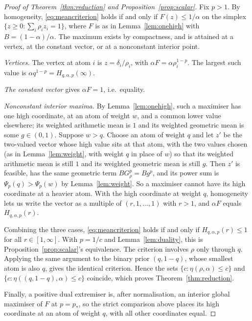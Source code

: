 \documentclass[11pt,a4paper]{article}
\numberwithin{equation}{section}
\theoremstyle{definition}
\theoremstyle{remark}
\begin{document}
\begin{proof}[Proof of Theorem~\ref{thm:reduction} and Proposition~\ref{prop:scalar}]
Fix \(p>1\). By homogeneity, \eqref{eq:meancriterion} holds if and only if
\(F(z)\le 1/\alpha\) on the simplex \(\{z\ge0:\sum_i\rho_iz_i=1\}\), where
\(F\) is as in Lemma~\ref{lem:onehigh} with \(B=(1-\alpha)/\alpha\). The
maximum exists by compactness, and is attained at a vertex, at the constant
vector, or at a nonconstant interior point.

\emph{Vertices.} The vertex at atom \(i\) is \(z=\delta_i/\rho_i\), with
\(\alpha F=\alpha\rho_i^{1-p}\). The largest such value is
\(\alpha q^{1-p}=H_{q,\alpha,p}(\infty)\).

\emph{The constant vector} gives \(\alpha F=1\), i.e.\ equality.

\emph{Nonconstant interior maxima.} By Lemma~\ref{lem:onehigh}, such a
maximiser has one high coordinate, at an atom of weight \(w\), and a common
lower value elsewhere; its weighted arithmetic mean is \(1\) and its
weighted geometric mean is some \(g\in(0,1)\). Suppose \(w>q\). Choose an
atom of weight \(q\) and let \(z'\) be the two-valued vector whose high
value sits at that atom, with the two values chosen (as in
Lemma~\ref{lem:weight}, with weight \(q\) in place of \(w\)) so that its
weighted arithmetic mean is still \(1\) and its weighted geometric mean is
still \(g\). Then \(z'\) is feasible, has the same geometric term
\(BG_\rho^p=Bg^p\), and its power sum is \(\Psi_p(q)>\Psi_p(w)\) by
Lemma~\ref{lem:weight}.
So a maximiser cannot have its high coordinate at a heavier atom. With the
high coordinate at weight \(q\), homogeneity lets us write the vector as a
multiple of \((r,1,\ldots,1)\) with \(r>1\), and \(\alpha F\) equals
\(H_{q,\alpha,p}(r)\).

Combining the three cases, \eqref{eq:meancriterion} holds if and only if
\(H_{q,\alpha,p}(r)\le1\) for all \(r\in[1,\infty]\). With \(p=1/c\) and
Lemma~\ref{lem:duality}, this is Proposition~\ref{prop:scalar}'s
equivalence. The criterion involves \(\rho\) only through \(q\). Applying
the same argument to the binary prior \((q,1-q)\), whose smallest atom is
also \(q\), gives the identical criterion. Hence the sets
\(\{c:\eta(\rho,\alpha)\le c\}\) and \(\{c:\eta((q,1-q),\alpha)\le c\}\)
coincide, which proves Theorem~\ref{thm:reduction}.

Finally, a positive dual extremiser is, after normalisation, an interior
global maximiser of \(F\) at \(p=p_*\), so the strict comparison above
places its high coordinate at an atom of weight \(q\), with all other
coordinates equal.
\end{proof}
\end{document}
